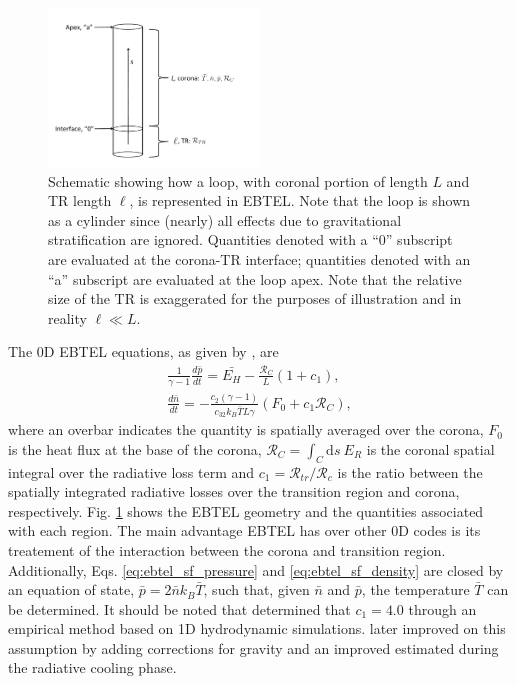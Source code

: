 \begin{figure}
	\centering
	\includegraphics[width=0.5\textwidth]{figures/ebtel_schematic.pdf}
	\caption{Schematic showing how a loop, with coronal portion of length $L$ and TR length $\ell$, is represented in EBTEL. Note that the loop is shown as a cylinder since (nearly) all effects due to gravitational stratification are ignored. Quantities denoted with a ``0'' subscript are evaluated at the corona-TR interface; quantities denoted with an ``a'' subscript are evaluated at the loop apex. Note that the relative size of the TR is exaggerated for the purposes of illustration and in reality $\ell\ll L$.}
	\label{fig:ebtel_schematic}
\end{figure}
%
\par The 0D EBTEL equations, as given by \citet{cargill_enthalpy-based_2012}, are
\begin{align}
	\frac{1}{\gamma - 1}\frac{d\bar{p}}{dt} = \bar{E_H} - \frac{\mathcal{R}_C}{L}(1+c_1), \label{eq:ebtel_sf_pressure} \\[0.5em]
	\frac{d\bar{n}}{dt} = -\frac{c_2(\gamma - 1)}{c_32k_B\bar{T}L\gamma}(F_0 + c_1\mathcal{R}_C), \label{eq:ebtel_sf_density}
\end{align}
where an overbar indicates the quantity is spatially averaged over the corona, $F_0$ is the heat flux at the base of the corona, $\mathcal{R}_C=\int_C\mathrm{d}s~E_R$ is the coronal spatial integral over the radiative loss term and $c_1=\mathcal{R}_{tr}/\mathcal{R}_c$ is the ratio between the spatially integrated radiative losses over the transition region and corona, respectively. Fig. \ref{fig:ebtel_schematic} shows the EBTEL geometry and the quantities associated with each region. The main advantage EBTEL has over other 0D codes is its treatement of the interaction between the corona and transition region. Additionally, Eqs. \ref{eq:ebtel_sf_pressure} and \ref{eq:ebtel_sf_density} are closed by an equation of state, $\bar{p}=2\bar{n}k_B\bar{T}$, such that, given $\bar{n}$ and $\bar{p}$, the temperature $\bar{T}$ can be determined. It should be noted that \citet{klimchuk_highly_2008} determined that $c_1=4.0$ through an empirical method based on 1D hydrodynamic simulations. \citet{cargill_enthalpy-based_2012} later improved on this assumption by adding corrections for gravity and an improved estimated during the radiative cooling phase.
